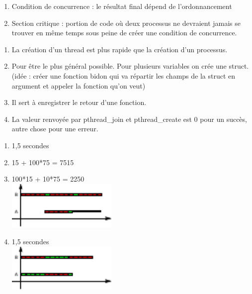 \begin{enumerate}
	\item Condition de concurrence : le résultat final dépend de l'ordonnancement
	\item Section critique : portion de code où deux processus ne devraient jamais se trouver en même temps sous peine de créer une condition de concurrence.
\end{enumerate}

\begin{enumerate}
	\item La création d'un thread est plus rapide que la création d'un processus.
	\item Pour être le plus général possible. Pour plusieurs variables on crée une struct. (idée : créer une fonction bidon qui va répartir les champs de la struct en argument et appeler la fonction qu'on veut)
	\item Il sert à enregistrer le retour d'une fonction.
	\item La valeur renvoyée par pthread\_join et pthread\_create est 0 pour un succès, autre chose pour une erreur.
\end{enumerate}

\begin{enumerate}
	\item 1,5 secondes
	\item 15 + 100*75 = 7515
	\item 100*15 + 10*75 = 2250 \\ \includegraphics[width=200px]{fig8.pdf}
	\item 1,5 secondes \\ \includegraphics[width=200px]{fig9.pdf}
\end{enumerate}


